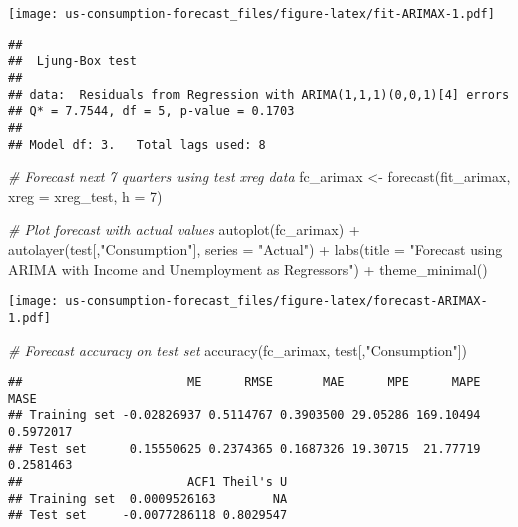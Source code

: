 \documentclass[
  12pt,
]{article}
\newenvironment{Shaded}{\begin{snugshade}}{\end{snugshade}}
\newcommand{\AttributeTok}[1]{\textcolor[rgb]{0.77,0.63,0.00}{#1}}
\newcommand{\CommentTok}[1]{\textcolor[rgb]{0.56,0.35,0.01}{\textit{#1}}}
\newcommand{\DecValTok}[1]{\textcolor[rgb]{0.00,0.00,0.81}{#1}}
\newcommand{\FunctionTok}[1]{\textcolor[rgb]{0.00,0.00,0.00}{#1}}
\newcommand{\NormalTok}[1]{#1}
\newcommand{\OtherTok}[1]{\textcolor[rgb]{0.56,0.35,0.01}{#1}}
\newcommand{\SpecialCharTok}[1]{\textcolor[rgb]{0.00,0.00,0.00}{#1}}
\newcommand{\StringTok}[1]{\textcolor[rgb]{0.31,0.60,0.02}{#1}}
\begin{document}
\texttt{[image: us-consumption-forecast\_files/figure-latex/fit-ARIMAX-1.pdf]}

\begin{verbatim}
## 
##  Ljung-Box test
## 
## data:  Residuals from Regression with ARIMA(1,1,1)(0,0,1)[4] errors
## Q* = 7.7544, df = 5, p-value = 0.1703
## 
## Model df: 3.   Total lags used: 8
\end{verbatim}

\begin{Shaded}
\begin{Highlighting}[]
\CommentTok{\# Forecast next 7 quarters using test xreg data}
\NormalTok{fc\_arimax }\OtherTok{\textless{}{-}} \FunctionTok{forecast}\NormalTok{(fit\_arimax, }\AttributeTok{xreg =}\NormalTok{ xreg\_test, }\AttributeTok{h =} \DecValTok{7}\NormalTok{)}

\CommentTok{\# Plot forecast with actual values}
\FunctionTok{autoplot}\NormalTok{(fc\_arimax) }\SpecialCharTok{+}
  \FunctionTok{autolayer}\NormalTok{(test[,}\StringTok{"Consumption"}\NormalTok{], }\AttributeTok{series =} \StringTok{"Actual"}\NormalTok{) }\SpecialCharTok{+}
  \FunctionTok{labs}\NormalTok{(}\AttributeTok{title =} \StringTok{"Forecast using ARIMA with Income and Unemployment as Regressors"}\NormalTok{) }\SpecialCharTok{+}
  \FunctionTok{theme\_minimal}\NormalTok{()}
\end{Highlighting}
\end{Shaded}

\texttt{[image: us-consumption-forecast\_files/figure-latex/forecast-ARIMAX-1.pdf]}

\begin{Shaded}
\begin{Highlighting}[]
\CommentTok{\# Forecast accuracy on test set}
\FunctionTok{accuracy}\NormalTok{(fc\_arimax, test[,}\StringTok{"Consumption"}\NormalTok{])}
\end{Highlighting}
\end{Shaded}

\begin{verbatim}
##                       ME      RMSE       MAE      MPE      MAPE      MASE
## Training set -0.02826937 0.5114767 0.3903500 29.05286 169.10494 0.5972017
## Test set      0.15550625 0.2374365 0.1687326 19.30715  21.77719 0.2581463
##                       ACF1 Theil's U
## Training set  0.0009526163        NA
## Test set     -0.0077286118 0.8029547
\end{verbatim}
\end{document}
